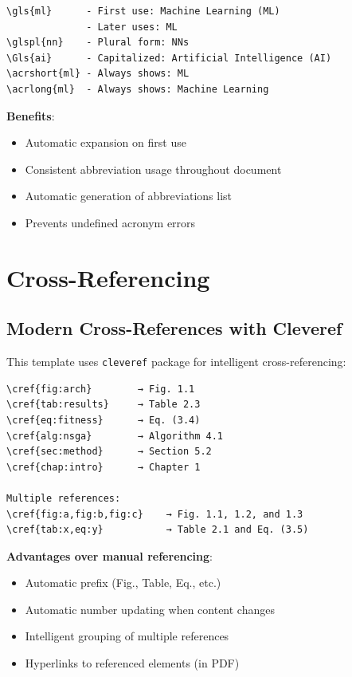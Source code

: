 \begin{verbatim}
\gls{ml}      - First use: Machine Learning (ML)
              - Later uses: ML
\glspl{nn}    - Plural form: NNs
\Gls{ai}      - Capitalized: Artificial Intelligence (AI)
\acrshort{ml} - Always shows: ML
\acrlong{ml}  - Always shows: Machine Learning
\end{verbatim}

\textbf{Benefits}:
\begin{itemize}
    \item Automatic expansion on first use
    \item Consistent abbreviation usage throughout document
    \item Automatic generation of abbreviations list
    \item Prevents undefined acronym errors
\end{itemize}

\section*{Cross-Referencing}

\subsection*{Modern Cross-References with Cleveref}

This template uses \texttt{cleveref} package for intelligent cross-referencing:

\begin{verbatim}
\cref{fig:arch}        → Fig. 1.1
\cref{tab:results}     → Table 2.3
\cref{eq:fitness}      → Eq. (3.4)
\cref{alg:nsga}        → Algorithm 4.1
\cref{sec:method}      → Section 5.2
\cref{chap:intro}      → Chapter 1

Multiple references:
\cref{fig:a,fig:b,fig:c}    → Fig. 1.1, 1.2, and 1.3
\cref{tab:x,eq:y}           → Table 2.1 and Eq. (3.5)
\end{verbatim}

\textbf{Advantages over manual referencing}:
\begin{itemize}
    \item Automatic prefix (Fig., Table, Eq., etc.)
    \item Automatic number updating when content changes
    \item Intelligent grouping of multiple references
    \item Hyperlinks to referenced elements (in PDF)
\end{itemize}

